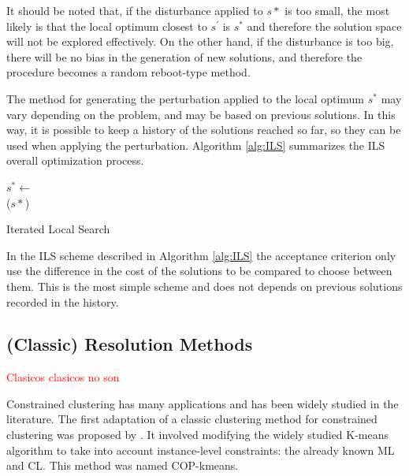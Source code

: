 \documentclass[review]{elsarticle}
\begin{document}
It should be noted that, if the disturbance applied to $s*$ is too small, the most likely is that the local optimum closest to $s^\prime$ is $s^*$ and therefore the solution space will not be explored effectively. On the other hand, if the disturbance is too big, there will be no bias in the generation of new solutions, and therefore the procedure becomes a random reboot-type method.


The method for generating the perturbation applied to the local optimum $s^*$ may vary depending on the problem, and may be based on previous solutions. In this way, it is possible to keep a history of the solutions reached so far, so they can be used when applying the perturbation. Algorithm \ref{alg:ILS} summarizes the ILS overall optimization process.

\begin{algorithm}
	\SetNlSkip{0.5em}
	\BlankLine
	$s^* \leftarrow$ \\
	\BlankLine
	\KwRet ($s*$)
	
	\caption{Iterated Local Search}\label{alg:ILS}
\end{algorithm}

In the ILS scheme described in Algorithm \ref{alg:ILS} the acceptance criterion only use the difference in the cost of the solutions to be compared to choose between them. This is the most simple scheme and does not depends on previous solutions recorded in the history. 

\clearpage

\subsection{(Classic) Resolution Methods}

\textcolor{red}{Clasicos clasicos no son}

Constrained clustering has many applications and has been widely studied in the literature. The first adaptation of a classic clustering method for constrained clustering was proposed by \cite{wagstaff2001constrained}. It involved modifying the widely studied K-means algorithm to take into account instance-level constraints: the already known ML and CL. This method was named COP-kmeans.
\end{document}
